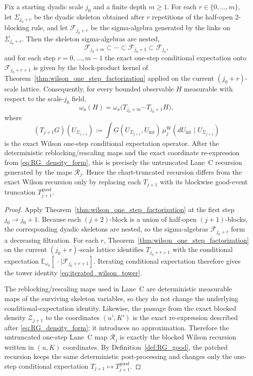 \begin{theorem}\label{thm:wilson_exact_recursion}
Fix a starting dyadic scale $j_0$ and a finite depth $m\ge 1$.
For each $r\in\{0,\dots,m\}$, let $\Sigma_{j_0+r}$ be the dyadic skeleton obtained after $r$ repetitions of the half-open $2$-blocking rule, and let $\mathcal F_{j_0+r}$ be the sigma-algebra generated by the links on $\Sigma_{j_0+r}$.
Then the skeleton sigma-algebras are nested,
\[
\mathcal F_{j_0+m}\subset\cdots\subset \mathcal F_{j_0+1}\subset \mathcal F_{j_0},
\]
and for each step $r=0,\dots,m-1$ the exact one-step conditional expectation onto $\mathcal F_{j_0+r+1}$ is given by the block-product kernel of Theorem~\ref{thm:wilson_one_step_factorization} applied on the current $(j_0+r)$-scale lattice.
Consequently, for every bounded observable $H$ measurable with respect to the scale-$j_0$ field,
\begin{equation}\label{eq:iterated_wilson_tower}
\omega_a(H)
=\omega_a\Big( T_{j_0+m}\cdots T_{j_0+1}H\Big),
\end{equation}
where
\[
(T_{j+1}G)(U_{\Sigma_{j+1}})
:=\int G(U_{\Sigma_{j+1}},U_{\mathrm{int}})\,\mu^{\mathrm W}_{j}(dU_{\mathrm{int}}\mid U_{\Sigma_{j+1}})
\]
is the exact Wilson one-step conditional expectation operator.
After the deterministic reblocking/rescaling maps and the exact coordinate re-expression from \eqref{eq:RG_density_form}, this is precisely the untruncated Lane~C recursion generated by the maps $\mathcal R_j$.
Hence the chart-truncated recursion differs from the exact Wilson recursion only by replacing each $T_{j+1}$ with its blockwise good-event truncation $T^{\mathrm{good}}_{j+1}$.
\end{theorem}

\begin{proof}
Apply Theorem~\ref{thm:wilson_one_step_factorization} at the first step $j_0\to j_0+1$.
Because each $(j+2)$-block is a union of half-open $(j+1)$-blocks, the corresponding dyadic skeletons are nested, so the sigma-algebras $\mathcal F_{j_0+r}$ form a decreasing filtration.
For each $r$, Theorem~\ref{thm:wilson_one_step_factorization} on the current $(j_0+r)$-scale lattice identifies $T_{j_0+r+1}$ with the conditional expectation $\mathbb E_{\omega_a}[\,\cdot\mid \mathcal F_{j_0+r+1}]$.
Iterating conditional expectation therefore gives the tower identity \eqref{eq:iterated_wilson_tower}.

The reblocking/rescaling maps used in Lane~C are deterministic measurable maps of the surviving skeleton variables, so they do not change the underlying conditional-expectation identity.
Likewise, the passage from the exact blocked density $\mathcal Z_{j+1}$ to the coordinates $(u',K')$ is the exact re-expression described after \eqref{eq:RG_density_form}; it introduces no approximation.
Therefore the untruncated one-step Lane~C map $\mathcal R_j$ is exactly the blocked Wilson recursion written in $(u,K)$ coordinates.
By Definition~\ref{def:RG_good}, the patched recursion keeps the same deterministic post-processing and changes only the one-step conditional expectation $T_{j+1}\mapsto T^{\mathrm{good}}_{j+1}$.
\end{proof}

